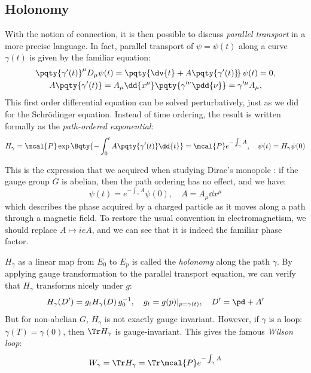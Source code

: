 \documentclass[a4paper,11pt]{article}
\begin{document}
\subsection{Holonomy}
	With the notion of connection, it is then possible to discuss \textit{parallel transport} in a more precise language. In fact, parallel transport of $\psi = \psi(t)$ along a curve $\gamma(t)$ is given by the familiar equation:
	\begin{gather}
		\pqty{\gamma'(t)}^\mu D_\mu \psi(t)
		= \pqty{
				\dv{t} + A\pqty{\gamma'(t)}\!
			}\,\psi(t)
		= 0,\\
		A\pqty{\gamma'(t)}
		= A_\mu \dd{x^\mu}
			\pqty{\gamma'^\nu \pdd{\nu}}
		= \gamma'^\mu A_\mu,
	\end{gather}
	This first order differential equation can be solved perturbatively, just as we did for the Schr\"odinger equation. Instead of time ordering, the result is written formally as the \textit{path-ordered exponential}:
	\begin{equation}
		H_\gamma = \mcal{P} \exp \Bqty{
				- \int_0^t A\pqty{\gamma'(t)} \dd{t}
			}
		= \mcal{P} e^{-\int_\gamma A},
		\quad
			\psi(t) = H_\gamma \psi(0)
	\end{equation}
	
	This is the expression that we acquired when studying Dirac's monopole \cite{Sakurai:2011zz}: if the gauge group $G$ is abelian, then the path ordering has no effect, and we have:
	\begin{equation}
		\psi(t)
		= e^{-\int_\gamma A} \psi(0),
		\quad
			A = A_\mu \dd{x^\mu}
	\end{equation}
	which describes the phase acquired by a charged particle as it moves along a path through a magnetic field. To restore the usual convention in electromagnetism, we should replace $A\mapsto ieA$, and we can see that it is indeed the familiar phase factor. 
	
	$H_\gamma$ as a linear map from $E_0$ to $E_p$ is called the \textit{holonomy} along the path $\gamma$. By applying gauge transformation to the parallel transport equation, we can verify that $H_\gamma$ transforms nicely under $g$:
	\begin{equation}
		H_\gamma(D')
		= g_t H_\gamma(D)\, g^{-1}_0,
		\quad
			g_t = g(p)|_{p = \gamma(t)},
		\quad
			D' = \pd + A'
	\end{equation}
	But for non-abelian $G$, $H_\gamma$ is not exactly gauge invariant. However, if $\gamma$ is a loop: $\gamma(T) = \gamma(0)$, then $\Tr H_\gamma$ is gauge-invariant. This gives the famous \textit{Wilson loop}:
	\begin{equation}
		W_\gamma
		= \Tr H_\gamma
		= \Tr \mcal{P} e^{-\int_\gamma A}
	\end{equation}
	
\end{document}
